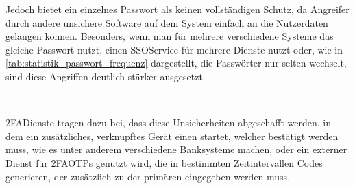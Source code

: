 Jedoch bietet ein einzelnes Passwort als  keinen vollständigen Schutz\autocite[\vglf][]{10.1145/3440712},  da Angreifer \zb durch andere unsichere Software auf dem System einfach an die Nutzerdaten gelangen können.
Besonders, wenn man für mehrere verschiedene Systeme das gleiche Passwort nutzt, einen \ac{SSO}\nonbreakdash Service für mehrere Dienste nutzt oder, wie in \autoref{tab:statistik_passwort_frequenz}\autocite{statista-passwort-reset} dargestellt, die Passwörter nur selten wechselt, sind diese Angriffen deutlich stärker ausgesetzt.
\begin{table}[htpb]
    \caption[Statistik zur Frequenz, in der Nutzer ihre Passwörter wechseln]{Statistik zur Frequenz, in der Nutzer ihre Passwörter wechseln\footnotemark\newline
    \small{Details: Weltweit; 2022; $>2000$ Befragte}}
    \label{tab:statistik_passwort_frequenz}
\end{table}\ 

\ac{2FA}\nonbreakdash Dienste tragen dazu bei, dass diese Unsicherheiten abgeschafft werden, in dem \zb ein zusätzliches, verknüpftes Gerät einen  startet, welcher bestätigt werden muss,  wie es unter anderem verschiedene Banksysteme machen, oder ein externer Dienst für \ac{2FA}\nonbreakdash \acp{OTP} genutzt wird, die in bestimmten Zeitintervallen Codes generieren, der zusätzlich zu der primären  eingegeben werden muss.